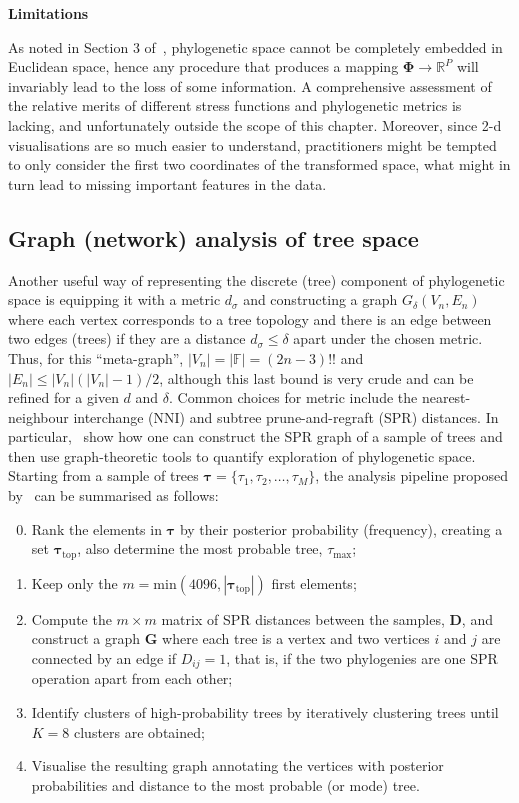 \textbf{Limitations}

As noted in Section 3 of~\cite{Willis2017}, phylogenetic space cannot be completely embedded in Euclidean space, hence any procedure that produces a mapping $\boldsymbol\Phi \to \mathbb{R}^P$ will invariably lead to the loss of some information.
A comprehensive assessment of the relative merits of different stress functions and phylogenetic metrics is lacking, and unfortunately outside the scope of this chapter.
Moreover, since 2-d visualisations are so much easier to understand, practitioners might be tempted to only consider the first two coordinates of the transformed space, what might in turn lead to missing important features in the data.

\subsection{Graph (network) analysis of tree space}
\label{sec:graph}

Another useful way of representing the discrete (tree) component of phylogenetic space is equipping it with a metric $d_\sigma$ and constructing a graph $G_\delta(V_n, E_n)$ where each vertex corresponds to a tree topology and there is an edge between two edges (trees) if they are a distance $d_\sigma \leq \delta$ apart under the chosen metric.
Thus, for this ``meta-graph'', $|V_n| = |\mathbb{F}| = (2n-3)!!$ and $|E_n| \leq |V_n| (|V_n| - 1)/2$, although this last bound is very crude and can be refined for a given $d$ and $\delta$.
Common choices for metric include the nearest-neighbour interchange (NNI) and subtree prune-and-regraft (SPR) distances.
In particular,~\cite{Whidden2015} show how one can construct the SPR graph of a sample of trees and then use graph-theoretic tools to quantify exploration of phylogenetic space. 
Starting from a sample of trees $\boldsymbol \tau = \{\tau_1, \tau_2, \ldots, \tau_M\}$, the analysis pipeline proposed by~\cite{Whidden2015} can be summarised as follows:
\begin{enumerate}
 \setcounter{enumi}{-1} 
 \item Rank the elements in $\boldsymbol\tau$ by their posterior probability (frequency), creating a set $\boldsymbol \tau_{\text{top}}$, also determine the most probable tree, $\tau_{\text{max}}$;
 \item Keep only the $m = \text{min}(4096, |\boldsymbol\tau_{\text{top}}|)$ first elements;
 \item Compute the $m \times m$ matrix of SPR distances between the samples, $\boldsymbol D$, and construct a graph $\boldsymbol G$ where each tree is a vertex and two vertices $i$ and $j$ are connected by an edge if $D_{ij} = 1$, that is, if the two phylogenies are one SPR operation apart from each other;
 \item Identify clusters of high-probability trees by iteratively clustering trees until $K=8$ clusters are obtained;
 \item Visualise the resulting graph annotating the vertices with posterior probabilities and distance to the most probable (or mode) tree. 
\end{enumerate}


